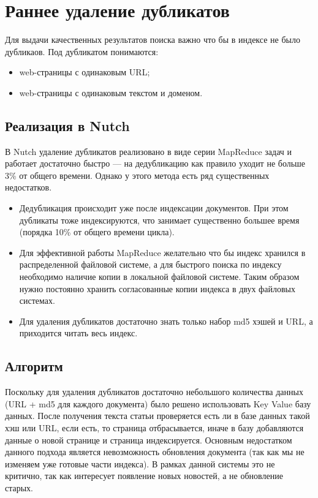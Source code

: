 \section{Раннее удаление дубликатов}
Для выдачи качественных результатов поиска важно что бы в индексе не было дубликаов. Под дубликатом понимаются:
\begin{itemize}
 \item web-страницы с одинаковым URL;
 \item web-страницы с одинаковым текстом и доменом. 
\end{itemize}
\subsection{Реализация в Nutch}
В Nutch удаление дубликатов реализовано в виде серии MapReduce задач и работает достаточно быстро --- на дедубликацию как правило уходит не больше 3\% от общего времени. Однако у этого метода есть ряд существенных недостатков.
\begin{itemize}
 \item Дедубликация происходит уже после индексации документов. При этом дубликаты тоже индексируются, что занимает существенно большее время (порядка 10\% от общего времени цикла).
 \item Для эффективной работы MapReduce желательно что бы индекс хранился в распределенной файловой системе, а для быстрого поиска по индексу необходимо наличие копии в локальной файловой системе. Таким образом  нужно постоянно хранить согласованные копии индекса в двух файловых системах.
 \item Для удаления дубликатов достаточно знать только набор md5 хэшей и URL, а приходится читать весь индекс.
\end{itemize}
\subsection{Алгоритм}
Поскольку для удаления дубликатов достаточно небольшого количества данных (URL + md5 для каждого документа) было решено использовать Key Value базу данных. После получения текста статьи проверяется есть ли в базе данных такой хэш или URL, если есть, то страница отбрасывается, иначе в базу добавляются данные о новой странице и страница индексируется. Основным недостатком данного подхода является невозможность обновления документа (так как мы не изменяем уже готовые части индекса). В рамках данной системы это не критично, так как интересует появление новых новостей, а не обновление старых.

